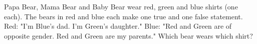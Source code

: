 Papa Bear, Mama Bear and Baby Bear wear red, green and blue shirts (one each). The bears in red and blue each make one true and one false statement. Red: "I'm Blue's dad. I'm Green's daughter." Blue: "Red and Green are of opposite gender. Red and Green are my parents." Which bear wears which shirt?
